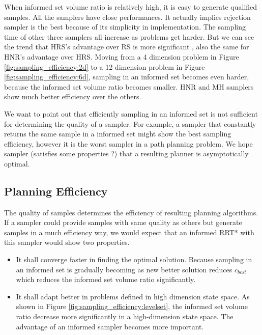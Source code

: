 \documentclass[letterpaper, 10 pt, conference]{ieeeconf}  %
\begin{document}
When informed set volume ratio is relatively high, it is easy to generate qualified samples.
All the samplers have close performances.
It actually implies rejection sampler is the best because of its simplicity in implementation.
The sampling time of other three samplers all increase as problems get harder.
But we can see the trend that HRS's advantage over RS is more significant , also the same for HNR's advantage over HRS.
Moving from a 4 dimension problem in Figure \ref{fig:sampling_efficiency:2d} to a 12 dimension problem in Figure \ref{fig:sampling_efficiency:6d}, sampling in an informed set becomes even harder,
because the informed set volume ratio becomes smaller.
HNR and MH samplers show much better efficiency over the others.

We want to point out that efficiently sampling in an informed set is not sufficient for determining the quality of a sampler.
For example, a sampler that constantly returns the same sample in a informed set might show the best sampling efficiency, however it is the worst sampler in a path planning problem.
We hope sampler (satisfies some properties ?) that a resulting planner is asymptotically optimal.



\subsection{Planning Efficiency}

The quality of samples determines the efficiency of resulting planning algorithms.
If a sampler could provide samples with same quality as others but generate samples in a much efficiency way, we would expect that an informed RRT* with this sampler would show two properties.
\begin{itemize}
	\item It shall converge faster in finding the optimal solution.
	Because sampling in an informed set is gradually becoming as new better solution reduces $ c_{best} $ which reduces the informed set volume ratio significantly.
	\item It shall adapt better in problems defined in high dimension state space.
	As shown in Figure \ref{fig:sampling_efficiency:levelset}, the informed set volume ratio decrease more significantly in a high-dimension state space.
	The advantage of an informed sampler becomes more important.
\end{itemize}
\end{document}
